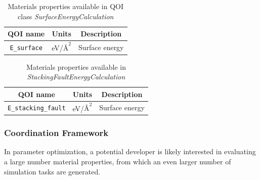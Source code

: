 \begin{table}[p]
	\centering
	\caption{Materials properties available in QOI class \emph{SurfaceEnergyCalculation}}
	\label{tbl:pypospack_qoi_lmps_surface_energy}
	\begin{tabular}{ccc}
		\hline
		QOI name & Units & Description \\
		\hline
		\verb|E_surface|
		  & eV/$\text{\AA}^2$
			& Surface energy \\
		\hline
	\end{tabular}
\end{table}

\begin{table}[p]
	\centering
	\caption{Materials properties available in \emph{StackingFaultEnergyCalculation}}
	\label{tbl:pypospack_qoi_lmps_stacking_fault}
	\begin{tabular}{ccc}
		\hline
		QOI name & Units & Description \\
		\hline
		\verb|E_stacking_fault|
		& eV/$\text{\AA}^2$
		& Surface energy \\
		\hline
	\end{tabular}
\end{table}

\subsubsection{Coordination Framework}

In parameter optimization, a potential developer is likely interested in evaluating a large number material properties, from which an even larger number of simulation tasks are generated.

